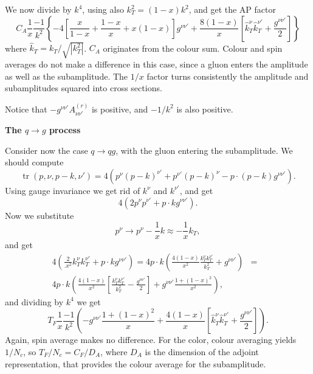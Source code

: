 \documentclass{letter}
\newcommand{\section}[1]{\medskip\bigskip

\noindent\textbf{\LARGE #1}}
\newcommand{\tmop}[1]{\ensuremath{\operatorname{#1}}}
\begin{document}
We now divide by $k^4$, using also $k_T^2 = (1 - x) k^2$, and get the AP
factor
\begin{equation}
  C_A \frac{1}{x}  \frac{- 1}{k^2}  \left\{ - 4 \left[ \frac{x}{1 - x} +
  \frac{1 - x}{x} + x (1 - x) \right] g^{\nu \nu'} + \frac{8 (1 - x)}{x}
  \left[ \hat{k}_T^{\nu}  \hat{k}_T^{\nu'} + \frac{g^{\nu \nu'}}{2} \right]
  \right\}
\end{equation}
where $\hat{k}_T = k_T / \sqrt{|k_T^2 |}$. $C_A$ originates from the colour
sum. Colour and spin averages do not make a difference in this case, since a
gluon enters the amplitude as well as the subamplitude. The $1 / x$ factor
turns consistently the amplitude and subamplitudes squared into cross
sections.

Notice that $- g^{\nu \nu'} A^{(r)}_{\nu \nu'}$ is positive, and $- 1 / k^2$
is also positive.

\section{The $q \rightarrow g$ process}

Consider now the case $q \rightarrow q g$, with the gluon entering the
subamplitude. We should compute
\begin{equation}
  \tmop{tr} (p, \nu, p - k, \nu') = 4 (p^{\nu} (p - k)^{\nu'} + p^{\nu'} (p -
  k)^{\nu} - p \cdot (p - k) g^{\nu \nu'}) .
\end{equation}
Using gauge invariance we get rid of $k^{\nu}$ and $k^{\nu'}$, and get
\begin{equation}
  4 (2 p^{\nu} p^{\nu'} + p \cdot k g^{\nu \nu'}) .
\end{equation}
Now we substitute
\begin{equation}
  p^{\nu} \rightarrow p^{\nu} - \frac{1}{x} k \approx - \frac{1}{x} k_T,
\end{equation}
and get
\begin{eqnarray}
  4 \left( \frac{2}{.x^2} k_T^{\nu} k_T^{\nu'} + p \cdot k g^{\nu \nu'}
  \right) = 4 p \cdot k \left( \frac{4 (1 - x)}{x^2}  \frac{k_T^{\nu}
  k_T^{\nu'}}{k_T^2} + g^{\nu \nu'} \right) & = &  \nonumber\\
  4 p \cdot k \left( \frac{4 (1 - x)}{x^2} \left[ \frac{k_T^{\nu}
  k_T^{\nu'}}{k_T^2} - \frac{g^{\nu \nu'}}{2} \right] + g^{\nu \nu'} \frac{1 +
  (1 - x)^2}{x^2} \right), &  & 
\end{eqnarray}
and dividing by $k^4$ we get
\begin{equation}
  T_F \frac{1}{x}  \frac{- 1}{k^2} \left( - g^{\nu \nu'} \frac{1 + (1 -
  x)^2}{x} + \frac{4 (1 - x)}{x} \left[ \hat{k}_T^{\nu}  \hat{k}_T^{\nu'} +
  \frac{g^{\nu \nu'}}{2} \right] \right) .
\end{equation}
Again, spin average makes no difference. For the color, colour averaging
yields $1 / N_c$, so $T_F / N_c = C_F / D_A$, where $D_A$ is the dimension of
the adjoint representation, that provides the colour average for the
subamplitude.
\end{document}

